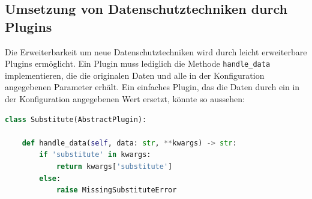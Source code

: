 \subsection{Umsetzung von Datenschutztechniken durch Plugins}
\label{sec_integration_in_ossim_plugins}

Die Erweiterbarkeit um neue Datenschutztechniken wird durch leicht erweiterbare Plugins ermöglicht. Ein Plugin muss lediglich die Methode \texttt{handle\_data} implementieren, die die originalen Daten und alle in der Konfiguration angegebenen Parameter erhält. Ein einfaches Plugin, das die Daten durch ein in der Konfiguration angegebenen Wert ersetzt, könnte so aussehen:

\begin{lstlisting}[language=Python]
class Substitute(AbstractPlugin):

    def handle_data(self, data: str, **kwargs) -> str:
        if 'substitute' in kwargs:
            return kwargs['substitute']
        else:
            raise MissingSubstituteError
\end{lstlisting}